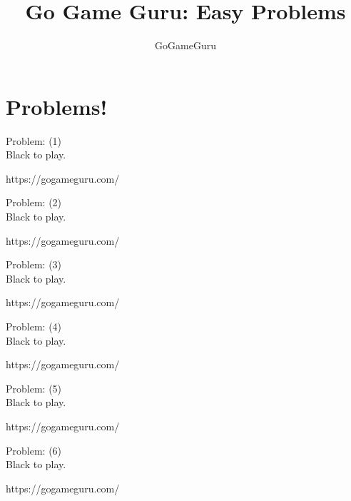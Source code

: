 \documentclass[11pt]{article}
\title{Go Game Guru: Easy Problems}
\author{GoGameGuru}
\date{ }
\begin{document}
\maketitle
\tableofcontents
\part{Problems!}
\begin{minipage}[t]{0.5\textwidth}
  {\centering
  
Problem: (1)\\
Black to play.

https://gogameguru.com/\\
  }
\end{minipage}
\begin{minipage}[t]{0.5\textwidth}
  {\centering
  
Problem: (2)\\
Black to play.

https://gogameguru.com/\\
  }
\end{minipage}
\begin{minipage}[t]{0.5\textwidth}
  {\centering
  
Problem: (3)\\
Black to play.

https://gogameguru.com/\\
  }
\end{minipage}
\begin{minipage}[t]{0.5\textwidth}
  {\centering
  
Problem: (4)\\
Black to play.

https://gogameguru.com/\\
  }
\end{minipage}
\begin{minipage}[t]{0.5\textwidth}
  {\centering
  
Problem: (5)\\
Black to play.

https://gogameguru.com/\\
  }
\end{minipage}
\begin{minipage}[t]{0.5\textwidth}
  {\centering
  
Problem: (6)\\
Black to play.

https://gogameguru.com/\\
  }
\end{minipage}
\end{document}
